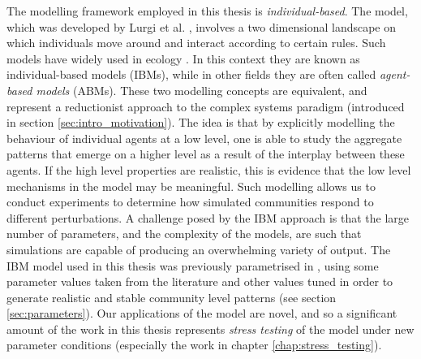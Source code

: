 The modelling framework employed in this thesis is \emph{individual-based}. The model, which was developed by Lurgi et al. \cite{lurgi2015effects}, involves a two dimensional landscape on which individuals move around and interact according to certain rules. Such models have widely used in ecology \cite{judson1994rise}. In this context they are known as individual-based models (IBMs), while in other fields they are often called \emph{agent-based models} (ABMs). These two modelling concepts are equivalent, and represent a reductionist approach to the complex systems paradigm (introduced in section \ref{sec:intro_motivation}). The idea is that by explicitly modelling the behaviour of individual agents at a low level, one is able to study the aggregate patterns that emerge on a higher level as a result of the interplay between these agents. If the high level properties are realistic, this is evidence that the low level mechanisms in the model may be meaningful. Such modelling allows us to conduct experiments to determine how simulated communities respond to different perturbations. A challenge posed by the IBM approach is that the large number of parameters, and the complexity of the models, are such that simulations are capable of producing an overwhelming variety of output. The IBM model used in this thesis was previously parametrised in \cite{lurgi2015effects}, using some parameter values taken from the literature and other values tuned in order to generate realistic and stable community level patterns (see section \ref{sec:parameters}). Our applications of the model are novel, and so a significant amount of the work in this thesis represents \emph{stress testing} of the model under new parameter conditions (especially the work in chapter \ref{chap:stress_testing}).         

